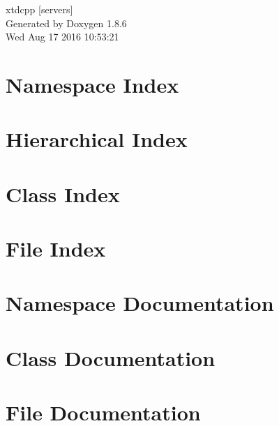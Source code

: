 \documentclass[twoside]{book}
\newcommand{\clearemptydoublepage}{%
  \newpage{\pagestyle{empty}\cleardoublepage}%
}
\begin{document}
\hypersetup{pageanchor=false}
\begin{titlepage}
\vspace*{7cm}
\begin{center}%
{\Large xtdcpp \mbox{[}servers\mbox{]} }\\
\vspace*{1cm}
{\large Generated by Doxygen 1.8.6}\\
\vspace*{0.5cm}
{\small Wed Aug 17 2016 10:53:21}\\
\end{center}
\end{titlepage}
\clearemptydoublepage
\tableofcontents
\clearemptydoublepage
{}
\hypersetup{pageanchor=true}

\chapter{Namespace Index}

\chapter{Hierarchical Index}

\chapter{Class Index}

\chapter{File Index}

\chapter{Namespace Documentation}




\chapter{Class Documentation}










\chapter{File Documentation}













\newpage
{}
{}
\printindex
\end{document}
